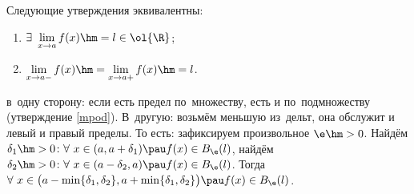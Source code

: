 \label{rile}
Следующие утверждения эквивалентны:
\begin{enumerate}
    \item $\exists\ \lim\limits_{x\to a}f(x)\hm=l\in\ol{\R}$;
    \item $\lim\limits_{x\to a-}f(x)\hm=\lim\limits_{x\to a+}f(x)\hm=l$.
\end{enumerate}

\begin{Proof}
    в~одну сторону: если есть предел по~множеству, есть и по~подмножеству (утверждение \ref{mpod}). В~другую: возьмём меньшую из~дельт, она обслужит и левый и правый пределы.
   То есть: зафиксируем произвольное $\e\hm>0$. Найдём $\delta_1\hm>0\colon \forall\  x\in (a,a+\delta_1)\pau f(x)\in B_\e(l)$, найдём
   $\delta_2\hm>0\colon \forall\  x\in (a-\delta_2,a)\pau f(x)\in B_\e(l)$. Тогда $\forall\  x\in \big(a-\min\{\delta_1,\delta_2\},a+\min\{\delta_1,\delta_2\}\big)\pau
   f(x)\in B_\e(l)$.
\end{Proof}

